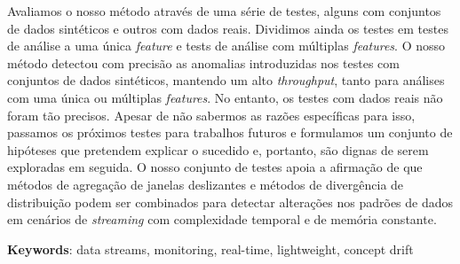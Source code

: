 Avaliamos o nosso método através de uma série de testes, alguns com conjuntos de dados sintéticos e outros com dados reais. Dividimos ainda os testes em testes de análise a uma única \textit{feature} e tests de análise com múltiplas \textit{features}. O nosso método detectou com precisão as anomalias introduzidas nos testes com conjuntos de dados sintéticos, mantendo um alto \textit{throughput}, tanto para análises com uma única ou múltiplas \textit{features}. No entanto, os testes com dados reais não foram tão precisos. Apesar de não sabermos as razões específicas para isso, passamos os próximos testes para trabalhos futuros e formulamos um conjunto de hipóteses que pretendem explicar o sucedido e, portanto, são dignas de serem exploradas em seguida. O nosso conjunto de testes apoia a afirmação de que métodos de agregação de janelas deslizantes e métodos de divergência de distribuição podem ser combinados para detectar alterações nos padrões de dados em cenários de \textit{streaming} com complexidade temporal e de memória constante.

\vspace*{10mm}\noindent
\textbf{Keywords}: data streams, monitoring, real-time, lightweight, concept drift